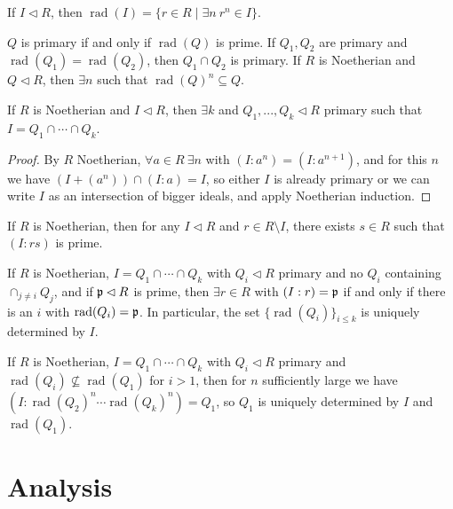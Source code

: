 \documentclass[letterpaper,11pt]{report}
\DeclareMathOperator{\rad}{rad}
\begin{document}
\begin{defn} If $I \lhd R$, then $\rad(I) = \{r \in R \mid \exists n\ r^n \in I\}$.
\end{defn}

\begin{prop} $Q$ is primary if and only if $\rad(Q)$ is prime. If $Q_1, Q_2$ are primary and $\rad(Q_1) = \rad(Q_2)$, then $Q_1 \cap Q_2$ is primary. If $R$ is Noetherian and $Q \lhd R$, then $\exists n$ such that $\rad(Q)^n \subseteq Q$.
\end{prop}

\begin{thm} If $R$ is Noetherian and $I \lhd R$, then $\exists k$ and $Q_1, ..., Q_k \lhd R$ primary such that $I = Q_1 \cap \cdots \cap Q_k$.
\end{thm}
\begin{proof} By $R$ Noetherian, $\forall a\in R\ \exists n$ with $(I:a^n) = (I:a^{n+1})$, and for this $n$ we have $(I+(a^n))\cap (I:a) = I$, so either $I$ is already primary or we can write $I$ as an intersection of bigger ideals, and apply Noetherian induction.
\end{proof}

\begin{lem} If $R$ is Noetherian, then for any $I \lhd R$ and $r \in R \setminus I$, there exists $s \in R$ such that $(I:rs)$ is prime.
\end{lem}

\begin{thm} If $R$ is Noetherian, $I = Q_1 \cap \cdots \cap Q_k$ with $Q_i \lhd R$ primary and no $Q_i$ containing $\cap_{j \ne i} Q_j$, and if $\mathfrak{p} \lhd R$ is prime, then $\exists r \in R$ with $(I:r) = \mathfrak{p}$ if and only if there is an $i$ with $\rad(Q_i) = \fp$. In particular, the set $\{\rad(Q_i)\}_{i \le k}$ is uniquely determined by $I$.
\end{thm}

\begin{thm} If $R$ is Noetherian, $I = Q_1 \cap \cdots \cap Q_k$ with $Q_i \lhd R$ primary and $\rad(Q_i) \not\subseteq \rad(Q_1)$ for $i > 1$, then for $n$ sufficiently large we have $(I:\rad(Q_2)^n \cdots \rad(Q_k)^n) = Q_1$, so $Q_1$ is uniquely determined by $I$ and $\rad(Q_1)$.
\end{thm}


\chapter{Analysis}
\end{document}
